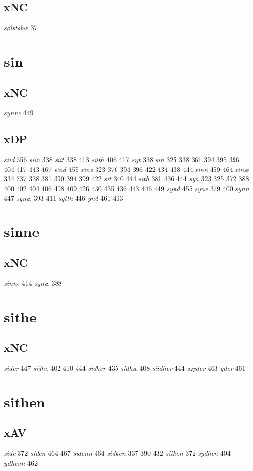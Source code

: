 \documentclass[a4paper,twocolumn]{article}
\begin{document}
\subsection{xNC}
\label{sec:org2391b4d}
\emph{sølstobæ} 371 
\section{sin}
\label{sec:org7add41c}
\subsection{xNC}
\label{sec:org45450f4}
\emph{synne} 449 
\subsection{xDP}
\label{sec:orga2e68c8}
\emph{siid} 356 \emph{siin} 338 \emph{siit} 338 413 \emph{siith} 406 417 \emph{sijt} 338 \emph{sin} 325 338 361 394 395 396 404 417 443 467 \emph{sind} 455 \emph{sine} 323 376 394 396 422 434 438 444 \emph{sinn} 459 464 \emph{sinæ} 334 337 338 381 390 394 399 422 \emph{sit} 340 444 \emph{sith} 381 436 444 \emph{syn} 323 325 372 388 400 402 404 406 408 409 426 430 435 436 443 446 449 \emph{synd} 455 \emph{syne} 379 400 \emph{synn} 447 \emph{synæ} 393 411 \emph{sytth} 446 \emph{ynd} 461 463 
\section{sinne}
\label{sec:org513b70f}
\subsection{xNC}
\label{sec:org4e8676c}
\emph{sinne} 414 \emph{synæ} 388 
\section{sithe}
\label{sec:org53c5b16}
\subsection{xNC}
\label{sec:org17cab95}
\emph{sider} 447 \emph{sidhe} 402 410 444 \emph{sidher} 435 \emph{sidhæ} 408 \emph{siidher} 444 \emph{szyder} 463 \emph{yder} 461 
\section{sithen}
\label{sec:org8709a13}
\subsection{xAV}
\label{sec:orgde1c323}
\emph{side} 372 \emph{siden} 464 467 \emph{sidenn} 464 \emph{sidhen} 337 390 432 \emph{sithen} 372 \emph{sydhen} 404 \emph{ydhenn} 462 
\end{document}
